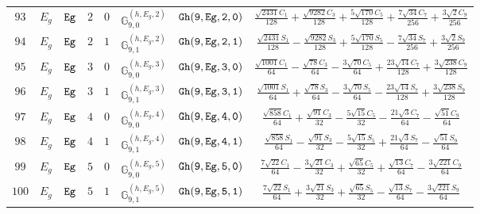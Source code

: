 \documentclass[fleqn,8pt]{jsarticle}
\begin{document}
\begin{table}[ht!]
\begin{center}
\begin{tabular}{cccccccc}
$ 93 $ & $ E_{g} $ & $ {\tt Eg} $ & $ 2 $ & $ 0 $ & $ \mathbb{G}_{9,0}^{(h,E_{g},2)} $ & $ {\tt Gh(9,Eg,2,0)} $ & $ \frac{\sqrt{2431} C_{1}}{128} + \frac{\sqrt{9282} C_{3}}{128} + \frac{5 \sqrt{170} C_{5}}{128} + \frac{7 \sqrt{34} C_{7}}{256} + \frac{3 \sqrt{2} C_{9}}{256} $ \\
$ 94 $ & $ E_{g} $ & $ {\tt Eg} $ & $ 2 $ & $ 1 $ & $ \mathbb{G}_{9,1}^{(h,E_{g},2)} $ & $ {\tt Gh(9,Eg,2,1)} $ & $ \frac{\sqrt{2431} S_{1}}{128} - \frac{\sqrt{9282} S_{3}}{128} + \frac{5 \sqrt{170} S_{5}}{128} - \frac{7 \sqrt{34} S_{7}}{256} + \frac{3 \sqrt{2} S_{9}}{256} $ \\
$ 95 $ & $ E_{g} $ & $ {\tt Eg} $ & $ 3 $ & $ 0 $ & $ \mathbb{G}_{9,0}^{(h,E_{g},3)} $ & $ {\tt Gh(9,Eg,3,0)} $ & $ \frac{\sqrt{1001} C_{1}}{64} - \frac{\sqrt{78} C_{3}}{64} - \frac{3 \sqrt{70} C_{5}}{64} + \frac{23 \sqrt{14} C_{7}}{128} + \frac{3 \sqrt{238} C_{9}}{128} $ \\
$ 96 $ & $ E_{g} $ & $ {\tt Eg} $ & $ 3 $ & $ 1 $ & $ \mathbb{G}_{9,1}^{(h,E_{g},3)} $ & $ {\tt Gh(9,Eg,3,1)} $ & $ \frac{\sqrt{1001} S_{1}}{64} + \frac{\sqrt{78} S_{3}}{64} - \frac{3 \sqrt{70} S_{5}}{64} - \frac{23 \sqrt{14} S_{7}}{128} + \frac{3 \sqrt{238} S_{9}}{128} $ \\
$ 97 $ & $ E_{g} $ & $ {\tt Eg} $ & $ 4 $ & $ 0 $ & $ \mathbb{G}_{9,0}^{(h,E_{g},4)} $ & $ {\tt Gh(9,Eg,4,0)} $ & $ \frac{\sqrt{858} C_{1}}{64} + \frac{\sqrt{91} C_{3}}{32} - \frac{5 \sqrt{15} C_{5}}{32} - \frac{21 \sqrt{3} C_{7}}{64} - \frac{\sqrt{51} C_{9}}{64} $ \\
$ 98 $ & $ E_{g} $ & $ {\tt Eg} $ & $ 4 $ & $ 1 $ & $ \mathbb{G}_{9,1}^{(h,E_{g},4)} $ & $ {\tt Gh(9,Eg,4,1)} $ & $ \frac{\sqrt{858} S_{1}}{64} - \frac{\sqrt{91} S_{3}}{32} - \frac{5 \sqrt{15} S_{5}}{32} + \frac{21 \sqrt{3} S_{7}}{64} - \frac{\sqrt{51} S_{9}}{64} $ \\
$ 99 $ & $ E_{g} $ & $ {\tt Eg} $ & $ 5 $ & $ 0 $ & $ \mathbb{G}_{9,0}^{(h,E_{g},5)} $ & $ {\tt Gh(9,Eg,5,0)} $ & $ \frac{7 \sqrt{22} C_{1}}{64} - \frac{3 \sqrt{21} C_{3}}{32} + \frac{\sqrt{65} C_{5}}{32} + \frac{\sqrt{13} C_{7}}{64} - \frac{3 \sqrt{221} C_{9}}{64} $ \\
$ 100 $ & $ E_{g} $ & $ {\tt Eg} $ & $ 5 $ & $ 1 $ & $ \mathbb{G}_{9,1}^{(h,E_{g},5)} $ & $ {\tt Gh(9,Eg,5,1)} $ & $ \frac{7 \sqrt{22} S_{1}}{64} + \frac{3 \sqrt{21} S_{3}}{32} + \frac{\sqrt{65} S_{5}}{32} - \frac{\sqrt{13} S_{7}}{64} - \frac{3 \sqrt{221} S_{9}}{64} $ \\
 \hline \hline
\end{tabular}
\end{center}
\end{table}
\end{document}

